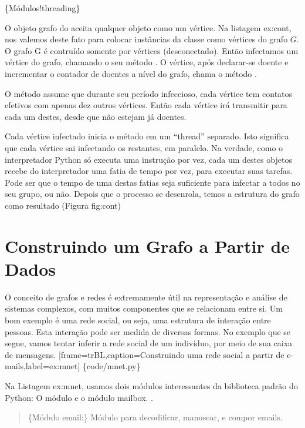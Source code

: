 \documentclass[a4paper,10pt,brazil]{sphinxmanual}
\begin{document}
\{Módulos!threading\}

O objeto grafo do  aceita qualquer objeto como um
vértice. Na listagem ex:cont, nos valemos deste fato para colocar
instâncias da classe  como vértices do grafo
$G$. O grafo G é contruído somente por vértices
(desconectado). Então infectamos um vértice do grafo, chamando o
seu método . O vértice, após declarar-se doente e
incrementar o contador de doentes a nível do grafo, chama o método
.

O método  assume que durante seu período infeccioso,
cada vértice tem contatos efetivos com apenas dez outros vértices.
Então cada vértice irá transmitir para cada um destes, desde que
não estejam já doentes.

Cada vértice infectado inicia o método  em um ``thread''
separado. Isto significa que cada vértice sai infectando os
restantes, em paralelo. Na verdade, como o interpretador Python só
executa uma instrução por vez, cada um destes objetos recebe do
interpretador uma fatia de tempo por vez, para executar suas
tarefas. Pode ser que o tempo de uma destas fatias seja suficiente
para infectar a todos no seu grupo, ou não. Depois que o processo
se desenrola, temos a estrutura do grafo como resultado (Figura
fig:cont)


\section{Construindo um Grafo a Partir de Dados}
\label{capgraph:construindo-um-grafo-a-partir-de-dados}
O conceito de grafos e redes é extremamente útil na representação e
análise de sistemas complexos, com muitos componentes que se
relacionam entre si. Um bom exemplo é uma rede social, ou seja, uma
estrutura de interação entre pessoas. Esta interação pode ser
medida de diversas formas. No exemplo que se segue, vamos tentar
inferir a rede social de um indivíduo, por meio de sua caixa de
mensagens.
{[}frame=trBL,caption=Construindo uma rede social a partir de e-mails,label=ex:mnet{]} \{code/mnet.py\}

Na Listagem ex:mnet, usamos dois módulos interessantes da
biblioteca padrão do Python: O módulo  e o módulo mailbox.
.
\begin{quote}

\{Módulo email:\} Módulo para decodificar, manusear, e compor
emails.
\end{quote}
\end{document}
